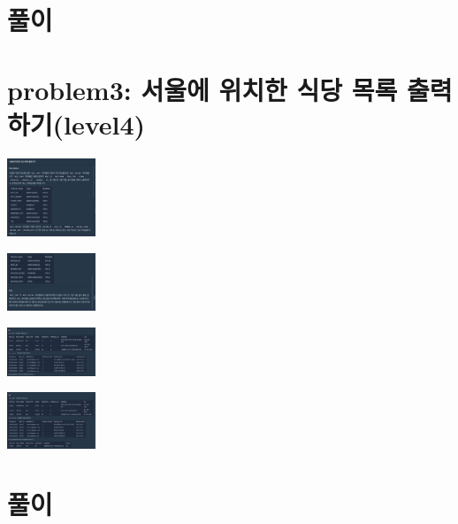 \documentclass[11pt]{article}
\begin{document}
\section*{풀이}
\label{sec:org26428a9}

\section*{problem3: 서울에 위치한 식당 목록 출력하기(level4)}
\label{sec:org62d8c8d}
\begin{center}
\includegraphics[width=100px]{../static/img/sql/p3-1.png}
\end{center}
\begin{center}
\includegraphics[width=100px]{../static/img/sql/p3-2.png}
\end{center}
\begin{center}
\includegraphics[width=100px]{../static/img/sql/p3-3.png}
\end{center}
\begin{center}
\includegraphics[width=100px]{../static/img/sql/p3-4.png}
\end{center}

\section*{풀이}
\label{sec:orgeaefb0b}
\end{document}
